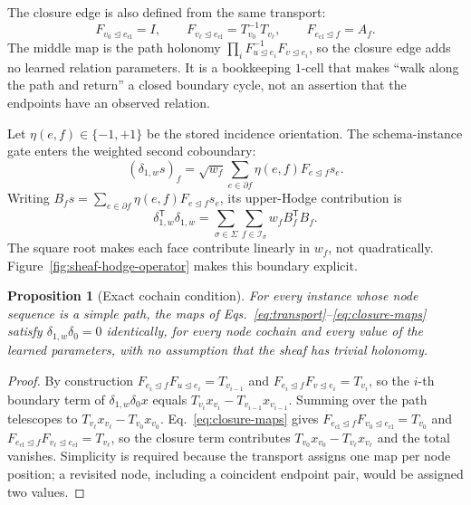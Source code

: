 \documentclass[sigconf,anonymous,review]{acmart}
\newcommand{\transpose}{\mathsf{T}}
\newtheorem{proposition}{Proposition}
\begin{document}
The closure edge is also defined from the same transport:
\begin{equation}
  F_{v_0\unlhd e_{\mathrm{cl}}}=I,
  \qquad
  F_{v_\ell\unlhd e_{\mathrm{cl}}}=T_{v_0}^{-1}T_{v_\ell},
  \qquad
  F_{e_{\mathrm{cl}}\unlhd f}=A_f .
  \label{eq:closure-maps}
\end{equation}
The middle map is the path holonomy
\(\prod_i F_{u\unlhd e_i}^{-1}F_{v\unlhd e_i}\), so the closure edge adds no learned relation
parameters.  It is a bookkeeping \(1\)-cell that makes ``walk along the path and return'' a closed
boundary cycle, not an assertion that the endpoints have an observed relation.

Let \(\eta(e,f)\in\{-1,+1\}\) be the stored incidence orientation.  The schema-instance gate enters
the weighted second coboundary:
\begin{equation}
  (\delta_{1,w}s)_f
  =\sqrt{w_f}\sum_{e\in\partial f}
    \eta(e,f)F_{e\unlhd f}s_e .
  \label{eq:delta1}
\end{equation}
Writing
\(B_fs=\sum_{e\in\partial f}\eta(e,f)F_{e\unlhd f}s_e\), its upper-Hodge contribution is
\begin{equation}
  \delta_{1,w}^{\transpose}\delta_{1,w}
  =\sum_{\sigma\in\Sigma}\sum_{f\in\mathcal{I}_{\sigma}}
    w_f B_f^{\transpose}B_f .
  \label{eq:weighted-up}
\end{equation}
The square root makes each face contribute linearly in \(w_f\), not quadratically.
Figure~\ref{fig:sheaf-hodge-operator} makes this boundary explicit.

\begin{proposition}[Exact cochain condition]
\label{prop:chain}
For every instance whose node sequence is a simple path, the maps of
Eqs.~\eqref{eq:transport}--\eqref{eq:closure-maps} satisfy
\(\delta_{1,w}\delta_0=0\) identically, for every node cochain and every value of the learned
parameters, with no assumption that the sheaf has trivial holonomy.
\end{proposition}

\begin{proof}
By construction \(F_{e_i\unlhd f}F_{u\unlhd e_i}=T_{v_{i-1}}\) and
\(F_{e_i\unlhd f}F_{v\unlhd e_i}=T_{v_i}\), so the \(i\)-th boundary term of
\(\delta_{1,w}\delta_0x\) equals
\(T_{v_i}x_{v_i}-T_{v_{i-1}}x_{v_{i-1}}\).  Summing over the path telescopes to
\(T_{v_\ell}x_{v_\ell}-T_{v_0}x_{v_0}\).  Eq.~\eqref{eq:closure-maps} gives
\(F_{e_{\mathrm{cl}}\unlhd f}F_{v_0\unlhd e_{\mathrm{cl}}}=T_{v_0}\) and
\(F_{e_{\mathrm{cl}}\unlhd f}F_{v_\ell\unlhd e_{\mathrm{cl}}}=T_{v_\ell}\), so the closure term
contributes \(T_{v_0}x_{v_0}-T_{v_\ell}x_{v_\ell}\) and the total vanishes.  Simplicity is required
because the transport assigns one map per node position; a revisited node, including a coincident
endpoint pair, would be assigned two values.
\end{proof}
\end{document}
